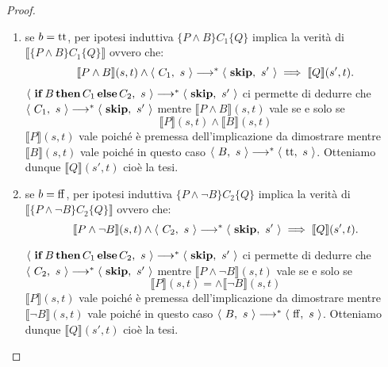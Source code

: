 \begin{teorema}
\begin{proof}
\begin{enumerate}
\item se $b = \mathrm{tt}$, per ipotesi induttiva
$\{P \land B\} C_1\{Q\}$ implica la verità di
$\bigl \llbracket \{P \land B\} C_1 \{Q\} \bigr \rrbracket$ ovvero che:
\[
  \llbracket P \land B \rrbracket(s, t) \land
    \langle\ C_1,\ s\ \rangle \longrightarrow^* \langle\ \mathop{\textup{\textbf{skip}}},\ s'\ \rangle
      \implies \llbracket Q \rrbracket(s', t).
\]
$\langle\ \mathop{\textup{\textbf{if}}} B \mathop{\textup{\textbf{then}}} C_1 \mathop{\textup{\textbf{else}}}
C_2,\ s\ \rangle \longrightarrow^* \langle\ \mathop{\textup{\textbf{skip}}},\ s'\ \rangle$ ci permette di dedurre che
$\langle\ C_1,\ s\ \rangle \longrightarrow^* \langle\ \mathop{\textup{\textbf{skip}}},\ s'\ \rangle$
mentre $\llbracket P \land B \rrbracket(s, t)$ vale se e solo se
\[
  \llbracket P \rrbracket(s, t)
    \land \llbracket B \rrbracket(s, t)
\]
$\llbracket P \rrbracket(s, t)$ vale poiché è premessa
dell'implicazione da dimostrare mentre $\llbracket B \rrbracket(s, t)$
vale poiché in questo caso $\langle\ B,\ s\ \rangle \longrightarrow^* \langle\ \mathrm{tt},\ s\ \rangle$.
Otteniamo dunque $\llbracket Q \rrbracket(s', t)$
cioè la tesi.

\item se $b = \mathrm{ff}$, per ipotesi induttiva
$\{P \land \neg B\} C_2\{Q\}$ implica la verità di
$\bigl \llbracket \{P \land \neg B\} C_2 \{Q\} \bigr \rrbracket$ ovvero che:
\[
  \llbracket P \land \neg B \rrbracket(s, t) \land
    \langle\ C_2,\ s\ \rangle \longrightarrow^* \langle\ \mathop{\textup{\textbf{skip}}},\ s'\ \rangle
      \implies \llbracket Q \rrbracket(s', t).
\]

$\langle\ \mathop{\textup{\textbf{if}}} B \mathop{\textup{\textbf{then}}} C_1 \mathop{\textup{\textbf{else}}}
C_2,\ s\ \rangle \longrightarrow^* \langle\ \mathop{\textup{\textbf{skip}}},\ s'\ \rangle$ ci permette di dedurre che
$\langle\ C_2,\ s\ \rangle \longrightarrow^* \langle\ \mathop{\textup{\textbf{skip}}},\ s'\ \rangle$
mentre $\llbracket P \land \neg B \rrbracket(s, t)$ vale se e solo se
\[
  \llbracket P \rrbracket(s, t) =
    \land \llbracket \neg B \rrbracket(s, t)
\]
$\llbracket P \rrbracket(s, t)$ vale poiché è premessa
dell'implicazione da dimostrare mentre $\llbracket \neg B \rrbracket(s, t)$
vale poiché in questo caso $\langle\ B,\ s\ \rangle \longrightarrow^* \langle\ \mathrm{ff},\ s\ \rangle$.
Otteniamo dunque $\llbracket Q \rrbracket(s', t)$
cioè la tesi.
\end{enumerate}
\end{proof}
\end{teorema}

